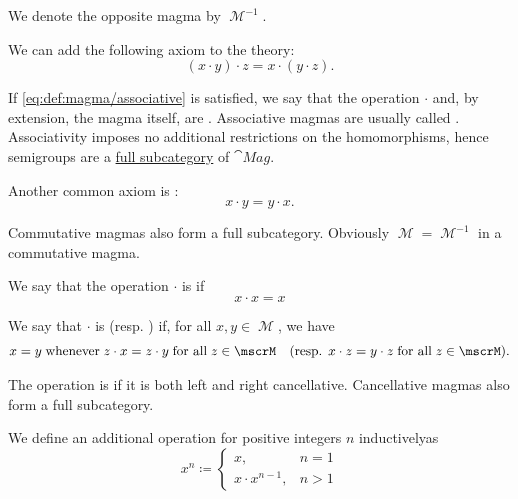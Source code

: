 \begin{definition}
\begin{thmenum}
    We denote the opposite magma by \( \mscrM^{-1} \).

     We can add the following axiom to the theory:
    \begin{equation}\label{eq:def:magma/associative}
      (x \cdot y) \cdot z = x \cdot (y \cdot z).
    \end{equation}

    If \eqref{eq:def:magma/associative} is satisfied, we say that the operation \( \cdot \) and, by extension, the magma itself, are . Associative magmas are usually called . Associativity imposes no additional restrictions on the homomorphisms, hence semigroups are a \hyperref[def:subcategory]{full subcategory} of \( \cat{Mag} \).

     Another common axiom is :
    \begin{equation}\label{eq:def:magma/commutative}
      x \cdot y = y \cdot x.
    \end{equation}

    Commutative magmas also form a full subcategory. Obviously \( \mscrM = \mscrM^{-1} \) in a commutative magma.

     We say that the operation \( \cdot \) is  if
    \begin{equation}\label{eq:def:magma/idempotent}
      x \cdot x = x
    \end{equation}

     We say that \( \cdot \) is  (resp. ) if, for all \( x, y \in \mscrM \), we have
    \begin{align}\label{eq:def:magma/cancellative}
      x = y \T{whenever} z \cdot x = z \cdot y \T{for all} z \in \mscrM
      &&
      (\text{resp. } x \cdot z = y \cdot z \T{for all} z \in \mscrM).
    \end{align}

    The operation is  if it is both left and right cancellative. Cancellative magmas also form a full subcategory.

     We define an additional  operation for positive integers \( n \) inductively\IND as
    \begin{equation}\label{eq:def:magma/exponentiation}
      x^n \coloneqq \begin{cases}
        x,               & n = 1 \\
        x \cdot x^{n-1}, & n > 1
      \end{cases}
    \end{equation}


\end{thmenum}
\end{definition}
